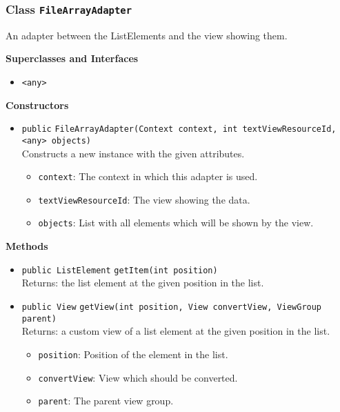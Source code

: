 \subsubsection{Class \lstinline|FileArrayAdapter|}
An adapter between the ListElements and the view showing them. \\



\textbf{Superclasses and Interfaces}
\begin{itemize}
\item \lstinline|<any>|
\end{itemize}



\textbf{Constructors}
\begin{itemize}
\item \lstinline|public| \lstinline|FileArrayAdapter|\lstinline|(Context context, int textViewResourceId, <any> objects)|\\
Constructs a new instance with the given attributes.
\begin{itemize}
\item \lstinline|context|: The context in which this adapter is used.
\item \lstinline|textViewResourceId|: The view showing the data.
\item \lstinline|objects|: List with all elements which will be shown by the view.
\end{itemize}



\end{itemize}


\textbf{Methods}
\begin{itemize}
\item \lstinline|public ListElement| \lstinline|getItem|\lstinline|(int position)|\\
Returns: the list element at the given position in the list.



\item \lstinline|public View| \lstinline|getView|\lstinline|(int position, View convertView, ViewGroup parent)|\\
Returns: a custom view of a list element at the given position in the list.
\begin{itemize}
\item \lstinline|position|: Position of the element in the list.
\item \lstinline|convertView|: View which should be converted.
\item \lstinline|parent|: The parent view group.
\end{itemize}



\end{itemize}


